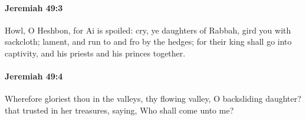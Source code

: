 		\paragraph{Jeremiah 49:3} %
			\label{JEREMIAH-49-3}

			Howl, O Heshbon, for Ai is spoiled: cry, ye daughters of Rabbah, gird you with sackcloth; lament, and run to and fro by the hedges; for their king shall go into captivity, and his priests and his princes together.


		\paragraph{Jeremiah 49:4} %
			\label{JEREMIAH-49-4}

			Wherefore gloriest thou in the valleys, thy flowing valley, O backsliding daughter? that trusted in her treasures, saying, Who shall come unto me?


